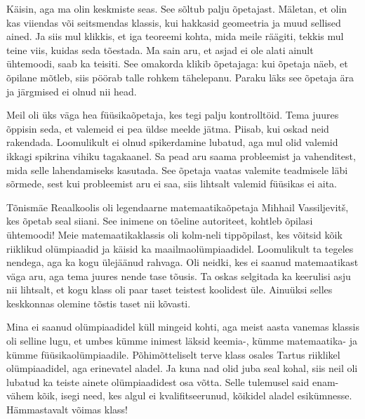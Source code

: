Käisin, aga ma olin keskmiste seas. See sõltub palju õpetajast. 
Mäletan, et olin kas viiendas või seitsmendas klassis, kui hakkasid geomeetria ja muud sellised ained. Ja siis mul 
klikkis, et iga teoreemi kohta, mida meile räägiti, tekkis mul teine 
viis, kuidas seda tõestada. Ma sain aru, et asjad ei ole alati ainult 
ühtemoodi, saab ka teisiti. See omakorda klikib õpetajaga: kui 
õpetaja näeb, et õpilane mõtleb, siis pöörab talle rohkem tähelepanu. Paraku läks see õpetaja ära ja järgmised ei olnud nii head.

Meil oli üks väga hea füüsikaõpetaja, kes tegi palju kontrolltöid. 
Tema juures õppisin seda, et valemeid ei pea üldse meelde jätma. Piisab, kui oskad neid rakendada. Loomulikult ei olnud spikerdamine 
lubatud, aga mul olid valemid ikkagi spikrina vihiku tagakaanel. Sa pead 
aru saama probleemist ja vahenditest, mida selle 
lahendamiseks kasutada. See õpetaja vaatas valemite teadmisele läbi sõrmede, sest 
kui probleemist aru ei saa, siis lihtsalt valemid füüsikas ei aita. 

Tõnismäe Reaalkoolis oli legendaarne 
matemaatikaõpetaja Mihhail Vassiljevitš, kes õpetab seal
siiani. See inimene on tõeline autoriteet, kohtleb 
õpilasi ühtemoodi! Meie matemaatikaklassis oli kolm-neli tippõpilast, kes 
võitsid kõik riiklikud olümpiaadid ja käisid ka maailmaolümpiaadidel. Loomulikult ta 
tegeles nendega, aga ka kogu ülejäänud rahvaga. Oli neidki, 
kes ei saanud matemaatikast väga aru, aga tema juures nende tase tõusis. Ta oskas 
selgitada ka keerulisi asju nii lihtsalt, et kogu klass 
oli paar taset teistest koolidest üle. Ainuüksi selles  
keskkonnas olemine tõstis taset nii kõvasti.



Mina ei saanud olümpiaadidel küll mingeid kohti, aga 
meist aasta vanemas klassis oli selline lugu, et umbes kümme inimest läksid keemia-, kümme 
matemaatika- ja kümme füüsikaolümpiaadile. Põhi{\-}mõtteliselt terve klass osales Tartus riiklikel
olümpiaadidel, aga erinevatel aladel. Ja kuna nad olid juba seal kohal, siis 
neil oli lubatud ka teiste ainete olümpiaadidest osa võtta. Selle tulemusel said enam-vähem kõik, isegi need, kes algul ei kvalifitseerunud,
kõikidel aladel esikümnesse. Hämmastavalt võimas klass!

